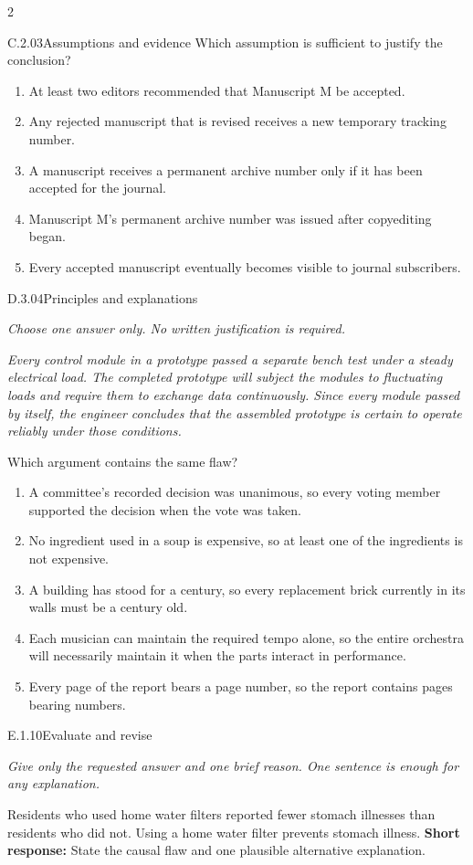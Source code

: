 \documentclass[9pt]{extarticle}
\newcommand{\choice}[1]{\item #1}
\begin{document}
\begin{multicols}{2}
\begin{DenseCoreProblem}{C.2.03}{Assumptions and evidence}
Which assumption is sufficient to justify the conclusion?
\begin{enumerate}[label=(\alph*)]
  \choice{At least two editors recommended that Manuscript M be accepted.}
  \choice{Any rejected manuscript that is revised receives a new temporary tracking number.}
  \choice{A manuscript receives a permanent archive number only if it has been accepted for the journal.}
  \choice{Manuscript M's permanent archive number was issued after copyediting began.}
  \choice{Every accepted manuscript eventually becomes visible to journal subscribers.}
\end{enumerate}
\end{DenseCoreProblem}
\begin{DenseCoreProblem}{D.3.04}{Principles and explanations}
{\scriptsize\textit{Choose one answer only. No written justification is required.}\par}
\emph{Every control module in a prototype passed a separate bench test under a steady electrical load. The completed prototype will subject the modules to fluctuating loads and require them to exchange data continuously. Since every module passed by itself, the engineer concludes that the assembled prototype is certain to operate reliably under those conditions.}

Which argument contains the same flaw?
\begin{enumerate}[label=(\alph*)]
  \choice{A committee's recorded decision was unanimous, so every voting member supported the decision when the vote was taken.}
  \choice{No ingredient used in a soup is expensive, so at least one of the ingredients is not expensive.}
  \choice{A building has stood for a century, so every replacement brick currently in its walls must be a century old.}
  \choice{Each musician can maintain the required tempo alone, so the entire orchestra will necessarily maintain it when the parts interact in performance.}
  \choice{Every page of the report bears a page number, so the report contains pages bearing numbers.}
\end{enumerate}
\end{DenseCoreProblem}
\begin{DenseCoreProblem}{E.1.10}{Evaluate and revise}
{\scriptsize\textit{Give only the requested answer and one brief reason. One sentence is enough for any explanation.}\par}
Residents who used home water filters reported fewer stomach illnesses than residents who did not. Using a home water filter prevents stomach illness.
\textbf{Short response:} State the causal flaw and one plausible alternative explanation.
\end{DenseCoreProblem}
\end{multicols}
\end{document}
